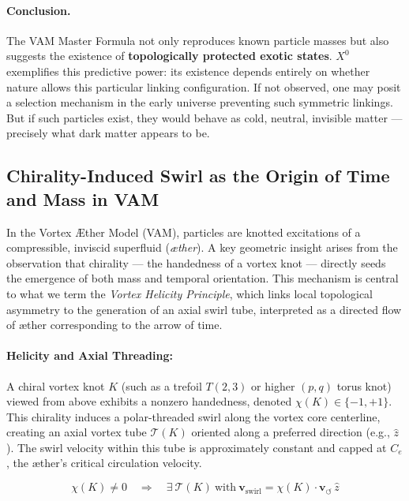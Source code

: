 \documentclass[a4paper,12pt]{article}
\begin{document}
\paragraph{Conclusion.}

The VAM Master Formula not only reproduces known particle masses but also suggests the existence of \textbf{topologically protected exotic states}. $X^0$ exemplifies this predictive power: its existence depends entirely on whether nature allows this particular linking configuration. If not observed, one may posit a selection mechanism in the early universe preventing such symmetric linkings. But if such particles exist, they would behave as cold, neutral, invisible matter — precisely what dark matter appears to be.
\subsection{Chirality-Induced Swirl as the Origin of Time and Mass in VAM}

In the Vortex Æther Model (VAM), particles are knotted excitations of a compressible, inviscid superfluid (\emph{æther}). A key geometric insight arises from the observation that chirality --- the handedness of a vortex knot --- directly seeds the emergence of both mass and temporal orientation. This mechanism is central to what we term the \emph{Vortex Helicity Principle}, which links local topological asymmetry to the generation of an axial swirl tube, interpreted as a directed flow of æther corresponding to the arrow of time.

\paragraph{Helicity and Axial Threading:}
A chiral vortex knot $K$ (such as a trefoil $T(2,3)$ or higher $(p,q)$ torus knot) viewed from above exhibits a nonzero handedness, denoted $\chi(K) \in \{-1, +1\}$. This chirality induces a polar-threaded swirl along the vortex core centerline, creating an axial vortex tube $\mathcal{T}(K)$ oriented along a preferred direction (e.g., $\hat{z}$). The swirl velocity within this tube is approximately constant and capped at $C_e$, the æther’s critical circulation velocity.

\begin{equation}
    \chi(K) \neq 0 \quad \Rightarrow \quad \exists~\mathcal{T}(K)~\text{with}~\mathbf{v}_{\text{swirl}} = \chi(K) \cdot \mathbf{v}_{\scriptscriptstyle\boldsymbol{\circlearrowleft}} \, \hat{z}
\end{equation}
\end{document}
